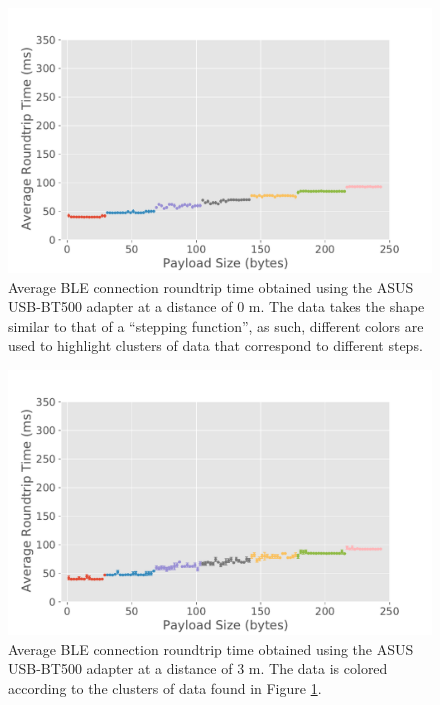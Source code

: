 \begin{figure}[H]
    \centering
    \includegraphics[width=0.9\linewidth]{images/ble-roundtrip-hci0-0cm.pdf}
    \caption[Average \acs{BLE} connection roundtrip time obtained using the ASUS USB-BT500 adapter at a distance of 0 m.]{Average \acs{BLE} connection roundtrip time obtained using the ASUS USB-BT500 adapter at a distance of $0\text{ m}$. The data takes the shape similar to that of a ``stepping function'', as such, different colors are used to highlight clusters of data that correspond to different steps.}
    \label{fig:ble-roundtrip-hci0-0m}
\end{figure}

\begin{figure}[H]
    \centering
    \includegraphics[width=0.9\linewidth]{images/ble-roundtrip-hci0-300cm.pdf}
    \caption[Average \acs{BLE} connection roundtrip time obtained using the ASUS USB-BT500 adapter at a distance of 3 m.]{Average \acs{BLE} connection roundtrip time obtained using the ASUS USB-BT500 adapter at a distance of $3\text{ m}$. The data is colored according to the clusters of data found in Figure \ref{fig:ble-roundtrip-hci0-0m}.}
    \label{fig:ble-roundtrip-hci0-3m}
\end{figure}

